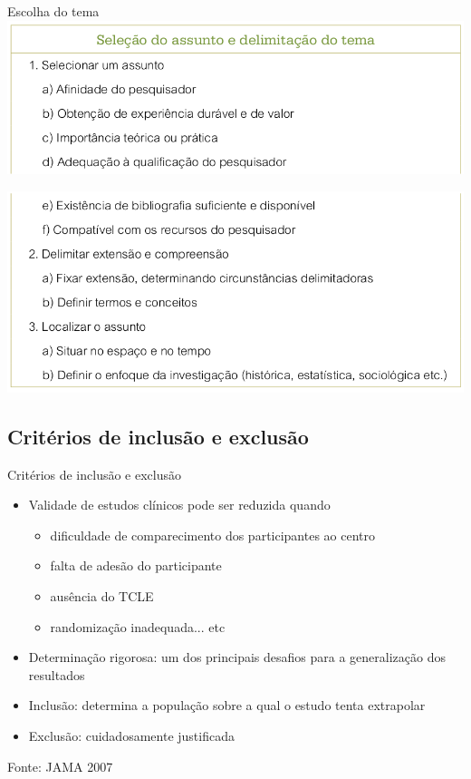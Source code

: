 \documentclass{beamer}
\begin{document}
\begin{frame}{Escolha do tema}
  \includegraphics[width=\textwidth]{Etapas/delimitacao1}

  \includegraphics[width=\textwidth]{Etapas/delimitacao2}
\end{frame}

\subsection{Critérios de inclusão e exclusão}

\begin{frame}{Critérios de inclusão e exclusão}
  \begin{itemize}
  \item Validade de estudos clínicos pode ser reduzida quando
    \begin{itemize}
    \item dificuldade de comparecimento dos participantes ao centro
    \item falta de adesão do participante
    \item ausência do TCLE
    \item randomização inadequada... etc
    \end{itemize}
  \item Determinação rigorosa: um dos principais desafios para a generalização dos resultados
  \item Inclusão: determina a população sobre a qual o estudo tenta extrapolar
  \item Exclusão: cuidadosamente justificada
  \end{itemize}

  \vfill
  \small
  Fonte: JAMA 2007
\end{frame}
\end{document}
